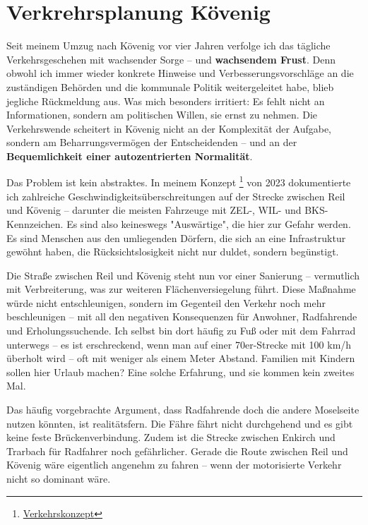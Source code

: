 \section{Verkrehrsplanung Kövenig}
Seit meinem Umzug nach Kövenig vor vier Jahren verfolge ich das tägliche Verkehrsgeschehen mit wachsender Sorge – und \textbf{wachsendem Frust}. Denn obwohl ich immer wieder konkrete Hinweise und Verbesserungsvorschläge an die zuständigen Behörden und die kommunale Politik weitergeleitet habe, blieb jegliche Rückmeldung aus. Was mich besonders irritiert: Es fehlt nicht an Informationen, sondern am politischen Willen, sie ernst zu nehmen. Die Verkehrswende scheitert in Kövenig nicht an der Komplexität der Aufgabe, sondern am Beharrungsvermögen der Entscheidenden – und an der \textbf{Bequemlichkeit einer autozentrierten Normalität}.

Das Problem ist kein abstraktes. In meinem Konzept \footnote{\href{https://github.com/r66ad/Verkehrskonzept}{Verkehrskonzept}} von 2023 dokumentierte ich zahlreiche Geschwindigkeitsüberschreitungen auf der Strecke zwischen Reil und Kövenig – darunter die meisten Fahrzeuge mit ZEL-, WIL- und BKS-Kennzeichen. Es sind also keineswegs "Auswärtige", die hier zur Gefahr werden. Es sind Menschen aus den umliegenden Dörfern, die sich an eine Infrastruktur gewöhnt haben, die Rücksichtslosigkeit nicht nur duldet, sondern begünstigt.

Die Straße zwischen Reil und Kövenig steht nun vor einer Sanierung – vermutlich mit Verbreiterung, was zur weiteren Flächenversiegelung führt. Diese Maßnahme würde nicht entschleunigen, sondern im Gegenteil den Verkehr noch mehr beschleunigen – mit all den negativen Konsequenzen für Anwohner, Radfahrende und Erholungssuchende. Ich selbst bin dort häufig zu Fuß oder mit dem Fahrrad unterwegs – es ist erschreckend, wenn man auf einer 70er-Strecke mit 100 km/h überholt wird – oft mit weniger als einem Meter Abstand. Familien mit Kindern sollen hier Urlaub machen? Eine solche Erfahrung, und sie kommen kein zweites Mal.

Das häufig vorgebrachte Argument, dass Radfahrende doch die andere Moselseite nutzen könnten, ist realitätsfern. Die Fähre fährt nicht durchgehend und es gibt keine feste Brückenverbindung. Zudem ist die Strecke zwischen Enkirch und Trarbach für Radfahrer noch gefährlicher. Gerade die Route zwischen Reil und Kövenig wäre eigentlich angenehm zu fahren – wenn der motorisierte Verkehr nicht so dominant wäre.

